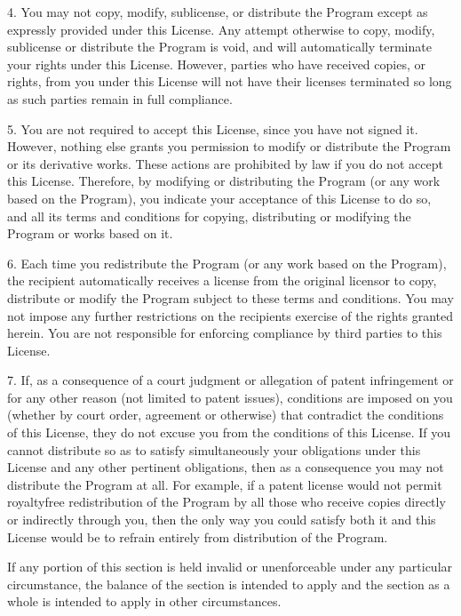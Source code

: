 \documentclass[letterpaper,10pt,english,openany,oneside]{sphinxmanual}
\begin{document}
\begin{sphinxVerbatim}[commandchars=\\\{\}]
  4. You may not copy, modify, sublicense, or distribute the Program
except as expressly provided under this License.  Any attempt
otherwise to copy, modify, sublicense or distribute the Program is
void, and will automatically terminate your rights under this License.
However, parties who have received copies, or rights, from you under
this License will not have their licenses terminated so long as such
parties remain in full compliance.

  5. You are not required to accept this License, since you have not
signed it.  However, nothing else grants you permission to modify or
distribute the Program or its derivative works.  These actions are
prohibited by law if you do not accept this License.  Therefore, by
modifying or distributing the Program (or any work based on the
Program), you indicate your acceptance of this License to do so, and
all its terms and conditions for copying, distributing or modifying
the Program or works based on it.

  6. Each time you redistribute the Program (or any work based on the
Program), the recipient automatically receives a license from the
original licensor to copy, distribute or modify the Program subject to
these terms and conditions.  You may not impose any further
restrictions on the recipients\PYGZsq{} exercise of the rights granted herein.
You are not responsible for enforcing compliance by third parties to
this License.

  7. If, as a consequence of a court judgment or allegation of patent
infringement or for any other reason (not limited to patent issues),
conditions are imposed on you (whether by court order, agreement or
otherwise) that contradict the conditions of this License, they do not
excuse you from the conditions of this License.  If you cannot
distribute so as to satisfy simultaneously your obligations under this
License and any other pertinent obligations, then as a consequence you
may not distribute the Program at all.  For example, if a patent
license would not permit royalty\PYGZhy{}free redistribution of the Program by
all those who receive copies directly or indirectly through you, then
the only way you could satisfy both it and this License would be to
refrain entirely from distribution of the Program.

If any portion of this section is held invalid or unenforceable under
any particular circumstance, the balance of the section is intended to
apply and the section as a whole is intended to apply in other
circumstances.


\end{sphinxVerbatim}
\end{document}
